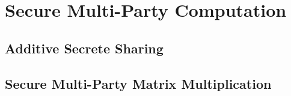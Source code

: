 \thispagestyle{myheadings}

\graphicspath{{2_Body/Figures/}}

\section{Secure Multi-Party Computation}
\subsection{Additive Secrete Sharing}
\subsection{Secure Multi-Party Matrix Multiplication}